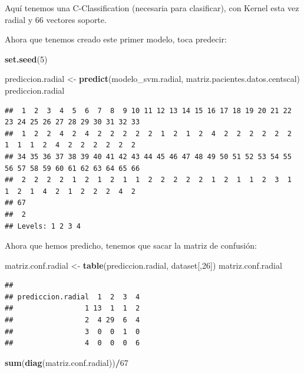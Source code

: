 \documentclass[]{article}
\newenvironment{Shaded}{\begin{snugshade}}{\end{snugshade}}
\newcommand{\KeywordTok}[1]{\textcolor[rgb]{0.13,0.29,0.53}{\textbf{#1}}}
\newcommand{\DecValTok}[1]{\textcolor[rgb]{0.00,0.00,0.81}{#1}}
\newcommand{\StringTok}[1]{\textcolor[rgb]{0.31,0.60,0.02}{#1}}
\newcommand{\OperatorTok}[1]{\textcolor[rgb]{0.81,0.36,0.00}{\textbf{#1}}}
\newcommand{\NormalTok}[1]{#1}
\begin{document}
Aquí tenemos una C-Classification (necesaria para clasificar), con
Kernel esta vez radial y 66 vectores soporte.

Ahora que tenemos creado este primer modelo, toca predecir:

\begin{Shaded}
\begin{Highlighting}[]
\KeywordTok{set.seed}\NormalTok{(}\DecValTok{5}\NormalTok{)}

\NormalTok{prediccion.radial <-}\StringTok{ }\KeywordTok{predict}\NormalTok{(modelo_svm.radial, matriz.pacientes.datos.centscal)}
\NormalTok{prediccion.radial}
\end{Highlighting}
\end{Shaded}

\begin{verbatim}
##  1  2  3  4  5  6  7  8  9 10 11 12 13 14 15 16 17 18 19 20 21 22 23 24 25 26 27 28 29 30 31 32 33 
##  1  2  2  4  2  4  2  2  2  2  2  1  2  1  2  4  2  2  2  2  2  2  1  1  1  2  4  2  2  2  2  2  2 
## 34 35 36 37 38 39 40 41 42 43 44 45 46 47 48 49 50 51 52 53 54 55 56 57 58 59 60 61 62 63 64 65 66 
##  2  2  2  2  1  2  1  2  1  1  2  2  2  2  2  1  2  1  1  2  3  1  1  2  1  4  2  1  2  2  2  4  2 
## 67 
##  2 
## Levels: 1 2 3 4
\end{verbatim}

Ahora que hemos predicho, tenemos que sacar la matriz de confusión:

\begin{Shaded}
\begin{Highlighting}[]
\NormalTok{matriz.conf.radial <-}\StringTok{ }\KeywordTok{table}\NormalTok{(prediccion.radial, dataset[,}\DecValTok{26}\NormalTok{])}
\NormalTok{matriz.conf.radial}
\end{Highlighting}
\end{Shaded}

\begin{verbatim}
##                  
## prediccion.radial  1  2  3  4
##                 1 13  1  1  2
##                 2  4 29  6  4
##                 3  0  0  1  0
##                 4  0  0  0  6
\end{verbatim}

\begin{Shaded}
\begin{Highlighting}[]
\KeywordTok{sum}\NormalTok{(}\KeywordTok{diag}\NormalTok{(matriz.conf.radial))}\OperatorTok{/}\DecValTok{67}
\end{Highlighting}
\end{Shaded}
\end{document}
